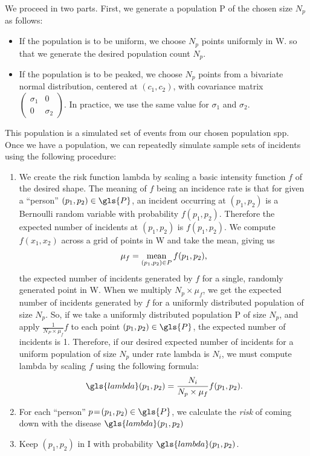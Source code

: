 We proceed in two parts.
First, we generate a population \gls{P} of the chosen size $N_p$ as follows:
\begin{itemize}
    \item If the population is to be uniform,
            we choose $N_p$ points uniformly in \gls{W}.
        so that we generate the desired population count $N_p$.
    \item If the population is to be peaked,
            we choose $N_p$ points from a bivariate normal distribution,
            centered at $(c_1, c_2)$,
            with covariance matrix
            $\begin{pmatrix}
                \sigma_1 & 0 \\
                0 & \sigma_2
            \end{pmatrix}$.
            In practice, we use the same value for $\sigma_1$ and $\sigma_2$.
\end{itemize}

This population is a simulated set of \glspl{event} from our chosen population \gls{spp}.
Once we have a population,
we can repeatedly simulate sample sets of \glspl{incident} using the following procedure:
\begin{enumerate}
    \item We create the risk function \gls{lambda}
        by scaling a basic \gls{intensity} function $f$ of the desired shape.
        The meaning of $f$ being an \gls{incidence rate} is that for given a ``person'' $(p_1, p_2) \in \gls{P}$,
        an incident occurring at $(p_1, p_2)$ is a Bernoulli random variable with probability $f(p_1, p_2)$.
        Therefore the expected number of \glspl{incident} at $(p_1, p_2)$ is $f(p_1, p_2)$.
        We compute $f(x_1, x_2)$ across a grid of points in \gls{W} and take the mean,
        giving us
        $$
            \mu_f = \operatorname*{\mbox{mean}}\limits_{(p_1, p_2) \in P}{f(p_1,p_2)} \text{,}
        $$
        the expected number of \glspl{incident} generated by $f$ for a single, randomly generated point in \gls{W}.
        When we multiply $N_p \times \mu_f$,
        we get the expected number of \glspl{incident} generated by $f$
        for a uniformly distributed population of size $N_p$.
        So, if we take a uniformly distributed population \gls{P} of size $N_p$,
        and apply $\frac{1}{N_P \times \mu_f} f$ to each point $(p_1, p_2) \in \gls{P}$,
        the expected number of \glspl{incident} is 1.
        Therefore, if our desired expected number of \glspl{incident} for a uniform population of size $N_p$
        under rate \gls{lambda} is $N_i$,
        we must compute \gls{lambda} by scaling $f$ using the following formula:
        $$
            \gls{lambda}(p_1, p_2) = \frac{N_i}{N_p \times \mu_f} f(p_1, p_2)\text{.}
        $$
    \item For each ``person'' $p\!=\!(p_1, p_2) \in \gls{P}$,
        we calculate the \textit{risk} of coming down with the disease $\gls{lambda}(p_1, p_2)$
    \item Keep $(p_1, p_2)$ in \gls{I} with probability $\gls{lambda}(p_1, p_2)$.
\end{enumerate}

